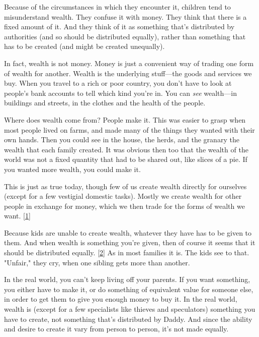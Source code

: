 Because
                  of the circumstances in which they encounter it, children tend
                  to misunderstand wealth. They confuse it with money. They
                  think that there is a fixed amount of it. And they think of it
                  as something that's distributed by authorities (and so should
                  be distributed equally), rather than something that has to be
                  created (and might be created unequally).

In fact,
                  wealth is not money. Money is just a convenient way of trading
                  one form of wealth for another. Wealth is the underlying
                  stuff---the goods and services we buy. When you travel to
                  a rich or poor country, you don't have to look at people's
                  bank accounts to tell which kind you're in. You can
                  \emph{see} wealth---in buildings and streets, in the
                  clothes and the health of the people.

Where does
                  wealth come from? People make it. This was easier to grasp
                  when most people lived on farms, and made many of the things
                  they wanted with their own hands. Then you could see in the
                  house, the herds, and the granary the wealth that each family
                  created. It was obvious then too that the wealth of the world
                  was not a fixed quantity that had to be shared out, like
                  slices of a pie. If you wanted more wealth, you could make
                  it.

This is just as true today, though few of us
                  create wealth directly for ourselves (except for a few
                  vestigial domestic tasks). Mostly we create wealth for other
                  people in exchange for money, which we then trade for the
                  forms of wealth we want.
                  [\href{\#f1n}{1}]

Because kids are unable to create wealth,
                  whatever they have has to be given to them. And when wealth is
                  something you're given, then of course it seems that it should
                  be distributed equally.
                  [\href{\#f2n}{2}]
                  As in most families it is. The kids see to that. "Unfair,"
                  they cry, when one sibling gets more than another.

In
                  the real world, you can't keep living off your parents. If you
                  want something, you either have to make it, or do something of
                  equivalent value for someone else, in order to get them to
                  give you enough money to buy it. In the real world, wealth is
                  (except for a few specialists like thieves and speculators)
                  something you have to create, not something that's distributed
                  by Daddy. And since the ability and desire to create it vary
                  from person to person, it's not made equally.

